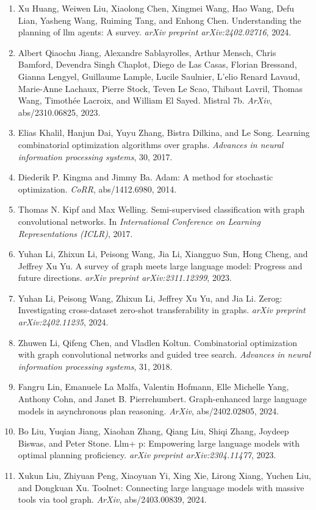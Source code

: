 \documentclass[11pt,UTF8,fontset=fandol]{ctexart}
\begin{document}
\begin{enumerate}[leftmargin=2em]
\item Xu Huang, Weiwen Liu, Xiaolong Chen, Xingmei Wang, Hao Wang, Defu Lian, Yasheng Wang, Ruiming Tang, and Enhong Chen. Understanding the planning of llm agents: A survey. \textit{arXiv preprint arXiv:2402.02716}, 2024.
\item Albert Qiaochu Jiang, Alexandre Sablayrolles, Arthur Mensch, Chris Bamford, Devendra Singh Chaplot, Diego de Las Casas, Florian Bressand, Gianna Lengyel, Guillaume Lample, Lucile Saulnier, L'elio Renard Lavaud, Marie-Anne Lachaux, Pierre Stock, Teven Le Scao, Thibaut Lavril, Thomas Wang, Timoth\'ee Lacroix, and William El Sayed. Mistral 7b. \textit{ArXiv}, abs/2310.06825, 2023.
\item Elias Khalil, Hanjun Dai, Yuyu Zhang, Bistra Dilkina, and Le Song. Learning combinatorial optimization algorithms over graphs. \textit{Advances in neural information processing systems}, 30, 2017.
\item Diederik P. Kingma and Jimmy Ba. Adam: A method for stochastic optimization. \textit{CoRR}, abs/1412.6980, 2014.
\item Thomas N. Kipf and Max Welling. Semi-supervised classification with graph convolutional networks. In \textit{International Conference on Learning Representations (ICLR)}, 2017.
\item Yuhan Li, Zhixun Li, Peisong Wang, Jia Li, Xiangguo Sun, Hong Cheng, and Jeffrey Xu Yu. A survey of graph meets large language model: Progress and future directions. \textit{arXiv preprint arXiv:2311.12399}, 2023.
\item Yuhan Li, Peisong Wang, Zhixun Li, Jeffrey Xu Yu, and Jia Li. Zerog: Investigating cross-dataset zero-shot transferability in graphs. \textit{arXiv preprint arXiv:2402.11235}, 2024.
\item Zhuwen Li, Qifeng Chen, and Vladlen Koltun. Combinatorial optimization with graph convolutional networks and guided tree search. \textit{Advances in neural information processing systems}, 31, 2018.
\item Fangru Lin, Emanuele La Malfa, Valentin Hofmann, Elle Michelle Yang, Anthony Cohn, and Janet B. Pierrehumbert. Graph-enhanced large language models in asynchronous plan reasoning. \textit{ArXiv}, abs/2402.02805, 2024.
\item Bo Liu, Yuqian Jiang, Xiaohan Zhang, Qiang Liu, Shiqi Zhang, Joydeep Biswas, and Peter Stone. Llm+ p: Empowering large language models with optimal planning proficiency. \textit{arXiv preprint arXiv:2304.11477}, 2023.
\item Xukun Liu, Zhiyuan Peng, Xiaoyuan Yi, Xing Xie, Lirong Xiang, Yuchen Liu, and Dongkuan Xu. Toolnet: Connecting large language models with massive tools via tool graph. \textit{ArXiv}, abs/2403.00839, 2024.

\end{enumerate}
\end{document}
